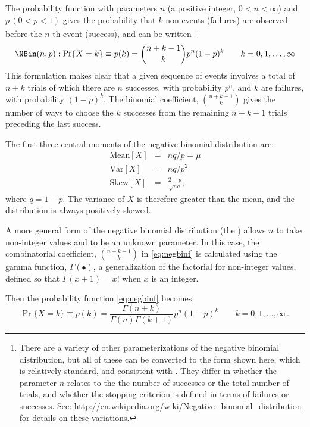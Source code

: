 \documentclass[11pt]{book}\usepackage[]{graphicx}\usepackage[]{color}
\begin{document}
The probability function with parameters $n$ (a positive integer, $0 < n < \infty$) and $p \, (0 < p < 1)$
gives the probability that $k$ non-events (failures) are observed before
the $n$-th event (success), and
can be written%
\footnote{
There are a variety of other parameterizations of the negative binomial distribution,
but all of these can be converted to the form shown here, which is relatively
standard, and consistent with \R. They differ in whether the parameter $n$
relates to the the number of successes or the total number of trials, and
whether the stopping criterion is defined in terms of failures or successes.
See: \url{http://en.wikipedia.org/wiki/Negative_binomial_distribution}
for details on these variations.
}
\begin{equation}\label{eq:negbinf}
\NBin(n,p):   \Pr \{ X = k \} \equiv p(k)  =
  {n+k-1 \choose k} p^n (1-p)^k
  \quad\quad k = 0, 1, \dots , \infty
\end{equation}
This formulation makes clear that a given sequence of events involves 
a total of $n+k$ trials of which there are $n$ successes,
with probability $p^n$, and $k$ are failures, with probability $(1-p)^k$.
The binomial coefficient, ${n+k-1 \choose k}$ gives the number of ways
to choose the $k$ successes from the remaining $n+k-1$ trials preceding
the last success.

The first three central moments of the negative binomial distribution are:
\begin{eqnarray*}
\textrm{Mean}[X] &=&nq / p  = \mu \\
\textrm{Var}[X] &=&nq / p^2 \\
\textrm{Skew}[X] &=&\frac{2-p}{\sqrt{nq}}
\comma
\end{eqnarray*}
where $q=1-p$. The variance of $X$ is therefore greater than the mean,
and the distribution is always positively skewed.

A more general form of the negative binomial distribution 
(the )
allows $n$ to take non-integer values and to be an unknown
parameter.
In this case, the combinatorial coefficient,
${n+k-1 \choose k}$ in \eqref{eq:negbinf} is calculated using
the gamma function, $\Gamma(\bullet)$,
a generalization of the factorial for non-integer values,
defined so that $\Gamma(x+1) = x!$ when $x$ is an integer.

Then the probability function \eqref{eq:negbinf} becomes
\begin{equation}\label{eq:negbinf2}
  \Pr \{ X = k \} \equiv p(k)  =
  \frac{\Gamma(n+k)}{\Gamma(n) \Gamma(k+1)}
   p^n (1-p)^k
  \quad\quad k = 0, 1, \dots , \infty
  \period
\end{equation}
\end{document}
